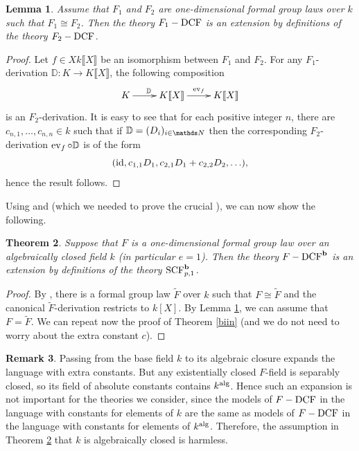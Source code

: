 \documentclass[10pt]{amsart}
\newtheorem{theorem}{Theorem}[section]
\newtheorem{lemma}[theorem]{Lemma}
\theoremstyle{definition}
\newtheorem{remark}[theorem]{Remark}
\begin{document}
\begin{lemma}\label{isodef}
Assume that $F_1$ and $F_2$ are one-dimensional formal group laws over $k$ such that $F_1\cong F_2$. Then the theory $F_1-\operatorname{DCF}$ is an extension by definitions of the theory $F_2-\operatorname{DCF}$.
\end{lemma}
\begin{proof}
Let $f\in Xk\llbracket X\rrbracket$ be an isomorphism between $F_1$ and $F_2$. For any $F_1$-derivation $\mathbb{D}:K\to K\llbracket X\rrbracket$, the following composition
\begin{equation*}
\xymatrix{K \ar[r]^{\mathbb{D}}  & K\llbracket X\rrbracket \ar[r]^{\ev_f}  & K\llbracket X\rrbracket}
\end{equation*}
is an $F_2$-derivation. It is easy to see that for each positive integer $n$, there are $c_{n,1},\ldots,c_{n,n}\in k$ such that if $\mathbb{D}=(D_i)_{i\in \Nn}$ then the corresponding $F_2$-derivation $\operatorname{ev}_f\circ \mathbb{D}$ is of the form
$$(\operatorname{id},c_{1,1}D_1,c_{2,1}D_1+c_{2,2}D_2,\ldots),$$
hence the result follows.
\end{proof}
Using \cite{LubinAns} and \cite{Bakur} (which we needed to prove the crucial \cite[Thm. 4.3]{HK2}), we can now show the following.
\begin{theorem}\label{onedimext}
Suppose that $F$ is a one-dimensional formal group law over an algebraically closed field $k$ (in particular $e=1$). Then the theory $F-\operatorname{DCF}^{\mathbf{b}}$ is an extension by definitions of the theory $\operatorname{SCF}^{\mathbf{b}}_{p,1}$.
\end{theorem}
\begin{proof}
By \cite[Thm. 4.3]{HK2}, there is a formal group law $\widetilde{F}$ over $k$ such that $F\cong \widetilde{F}$ and the canonical $\widetilde{F}$-derivation restricts to $k[X]$. By Lemma \ref{isodef}, we can assume that $F=\widetilde{F}$. We can repeat now the proof of Theorem \ref{biin} (and we do not need to worry about the extra constant $c$).
\end{proof}
\begin{remark}
Passing from the base field $k$ to its algebraic closure expands the language with extra constants. But any existentially closed $F$-field is separably closed, so its field of absolute constants contains $k^{\operatorname{alg}}$. Hence such an expansion is not important for the theories we consider, since the models of $F-\operatorname{DCF}$ in the language with constants for elements of $k$ are the same as models of $F-\operatorname{DCF}$ in the language with constants for elements of $k^{\operatorname{alg}}$. Therefore, the assumption in Theorem \ref{onedimext} that $k$ is algebraically closed is harmless.
\end{remark}
\end{document}
